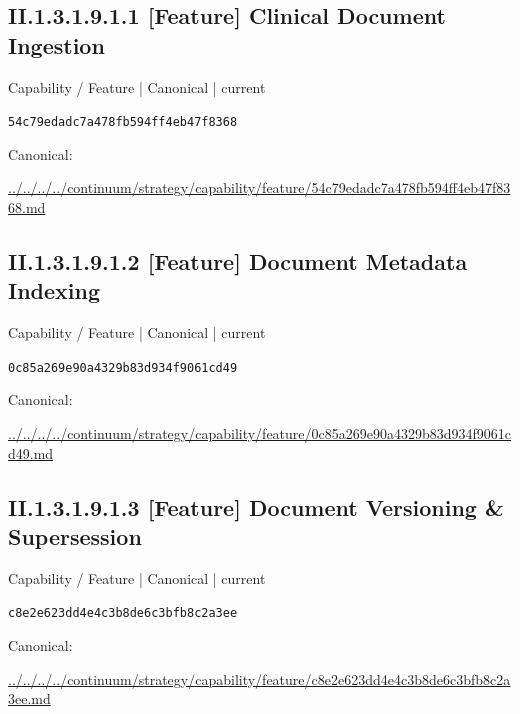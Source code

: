 \documentclass[10pt,a4paper]{article}
\begin{document}
\subsection*{II.1.3.1.9.1.1 [Feature] Clinical Document Ingestion}
\label{element-54c79edadc7a478fb594ff4eb47f8368}
{\small Capability / Feature | Canonical | current}\par
\texttt{54c79edadc7a478fb594ff4eb47f8368}\par
Canonical: \par
{\footnotesize\url{../../../../continuum/strategy/capability/feature/54c79edadc7a478fb594ff4eb47f8368.md}}\par
\subsection*{II.1.3.1.9.1.2 [Feature] Document Metadata Indexing}
\label{element-0c85a269e90a4329b83d934f9061cd49}
{\small Capability / Feature | Canonical | current}\par
\texttt{0c85a269e90a4329b83d934f9061cd49}\par
Canonical: \par
{\footnotesize\url{../../../../continuum/strategy/capability/feature/0c85a269e90a4329b83d934f9061cd49.md}}\par
\subsection*{II.1.3.1.9.1.3 [Feature] Document Versioning \& Supersession}
\label{element-c8e2e623dd4e4c3b8de6c3bfb8c2a3ee}
{\small Capability / Feature | Canonical | current}\par
\texttt{c8e2e623dd4e4c3b8de6c3bfb8c2a3ee}\par
Canonical: \par
{\footnotesize\url{../../../../continuum/strategy/capability/feature/c8e2e623dd4e4c3b8de6c3bfb8c2a3ee.md}}\par
\end{document}
